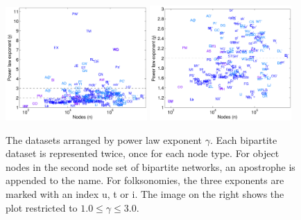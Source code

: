 \documentclass[11pt,a4paper]{book}
\newcommand{\wTwo}{0.48}
\begin{document}
\begin{figure}[h!]
  \centering
  \includegraphics[width=\wTwo\textwidth]{img-st/scatter.power.a}
  \includegraphics[width=\wTwo\textwidth]{img-st/scatter.power_detail.a}
  \caption{
    The datasets arranged by power law exponent $\gamma$.  Each
    bipartite dataset is represented twice, once for each node type.
    For object nodes in the second node set of bipartite networks, an
    apostrophe is appended to the name.  For folksonomies, the three
    exponents are marked with an index \textrm u, \textrm t or \textrm
    i.  The image on the right shows the plot restricted to $1.0 \leq
    \gamma \leq 3.0$.
  }
  \label{fig:scatter.power}
\end{figure}
\end{document}
